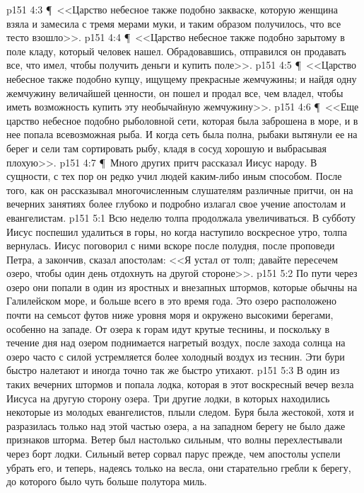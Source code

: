 \vs p151 4:3 \P\ <<Царство небесное также подобно закваске, которую женщина взяла и замесила с тремя мерами муки, и таким образом получилось, что все тесто взошло>>.
\vs p151 4:4 \P\ <<Царство небесное также подобно зарытому в поле кладу, который человек нашел. Обрадовавшись, отправился он продавать все, что имел, чтобы получить деньги и купить поле>>.
\vs p151 4:5 \P\ <<Царство небесное также подобно купцу, ищущему прекрасные жемчужины; и найдя одну жемчужину величайшей ценности, он пошел и продал все, чем владел, чтобы иметь возможность купить эту необычайную жемчужину>>.
\vs p151 4:6 \P\ <<Еще царство небесное подобно рыболовной сети, которая была заброшена в море, и в нее попала всевозможная рыба. И когда сеть была полна, рыбаки вытянули ее на берег и сели там сортировать рыбу, кладя в сосуд хорошую и выбрасывая плохую>>.
\vs p151 4:7 \P\ Много других притч рассказал Иисус народу. В сущности, с тех пор он редко учил людей каким\hyp{}либо иным способом. После того, как он рассказывал многочисленным слушателям различные притчи, он на вечерних занятиях более глубоко и подробно излагал свое учение апостолам и евангелистам.
\vs p151 5:1 Всю неделю толпа продолжала увеличиваться. В субботу Иисус поспешил удалиться в горы, но когда наступило воскресное утро, толпа вернулась. Иисус поговорил с ними вскоре после полудня, после проповеди Петра, а закончив, сказал апостолам: <<Я устал от толп; давайте пересечем озеро, чтобы один день отдохнуть на другой стороне>>.
\vs p151 5:2 По пути через озеро они попали в один из яростных и внезапных штормов, которые обычны на Галилейском море, и больше всего в это время года. Это озеро расположено почти на семьсот футов ниже уровня моря и окружено высокими берегами, особенно на западе. От озера к горам идут крутые теснины, и поскольку в течение дня над озером поднимается нагретый воздух, после захода солнца на озеро часто с силой устремляется более холодный воздух из теснин. Эти бури быстро налетают и иногда точно так же быстро утихают.
\vs p151 5:3 В один из таких вечерних штормов и попала лодка, которая в этот воскресный вечер везла Иисуса на другую сторону озера. Три другие лодки, в которых находились некоторые из молодых евангелистов, плыли следом. Буря была жестокой, хотя и разразилась только над этой частью озера, а на западном берегу не было даже признаков шторма. Ветер был настолько сильным, что волны перехлестывали через борт лодки. Сильный ветер сорвал парус прежде, чем апостолы успели убрать его, и теперь, надеясь только на весла, они старательно гребли к берегу, до которого было чуть больше полутора миль.
